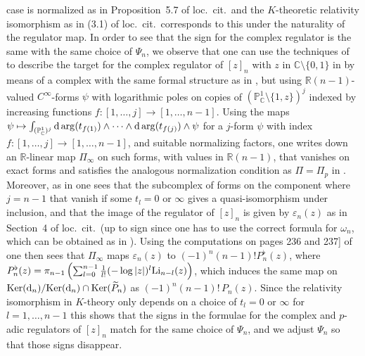 \documentclass{amsart}
\begin{document}
\begin{remark}
{{{\fi}}} case is normalized as in Proposition~5.7 of loc.\
cit.\ and the $ K $-theoretic relativity isomorphism as in (3.1) of loc.\ cit.\ 
corresponds to this under the naturality of the regulator map.
In order to see that the sign for the complex regulator is the same with the same choice of $ \Psi_n $,
we observe that one can use the techniques of \cite[Appendix~A and Section~5]{BdJ03} to describe the target
for the complex regulator of $ [z]_n $ with $ z $ in $ {\mathbb C}\setminus\{0,1\} $ in \cite{dJ95}
by means of a complex with the same formal structure as in \cite[Definition~5.2]{BdJ03}, but using
$ {\mathbb R}(n-1) $-valued $ C^\infty $-forms $ \psi $ with logarithmic poles on copies of $ (\mathbb{P}_{\mathbb C}^1\!\setminus\!\{1,z\})^j $
indexed by increasing functions $ f : [1,\dots,j] \to [1,\dots,n-1] $.  Using the maps
$ \psi \mapsto \int_{ (\mathbb{P}_{\mathbb C}^1)^j} {{\textup{d}}} \arg(t_{f(1)}) \wedge \cdots \wedge {{\textup{d}}} \arg(t_{f(j)}) \wedge \psi $
for a $ j $-form $ \psi $ with index $ f : [1,\dots,j] \to [1,\dots,n-1] $, and suitable normalizing factors, one writes down an $ {\mathbb R} $-linear map $ \Pi_\infty $ on such forms, with values in
$ {\mathbb R}(n-1) $, that vanishes on exact forms and satisfies the analogous normalization condition as $ \Pi=\Pi_p $
in \cite[Proposition~5.7]{BdJ03}.  Moreover, as in \cite[Section~2.5]{dJ95} one sees that the subcomplex
of forms on the component where $ j=n-1 $ that vanish if some $ t_l = 0 $ or $ \infty $ gives a quasi-isomorphism
under inclusion, and that the image of the regulator of $ [z]_n $ is given by $ \varepsilon_n(z) $ 
as in Section~4 of loc.\ cit.\ (up to sign since one has to use
the correct formula for $ \omega_n $, which can be obtained as in \cite[Section~6]{BdJ03}).
Using the computations on pages 236 and 237] of \cite{dJ95} one then sees that $ \Pi_\infty $ maps
$ \varepsilon_n(z) $ to $ (-1)^n (n-1)! P_n^\flat (z) $, where
$ P_n^\flat(z) =  \pi_{n-1}\left( \sum_{l=0}^{n-1} \frac{1}{l!} (-\log|z|)^l {\textup{Li}}_{n-l}(z) \right) $,
which induces the same map on $ {\operatorname{Ker}}({{\textup{d}}}_n)/{\operatorname{Ker}}({{\textup{d}}}_n) \cap {\operatorname{Ker}}(\widetilde P_n) $  as $ (-1)^n (n-1)! \, P_n(z) $.
Since the relativity isomorphism in $ K $-theory only depends on a choice of $ t_l =0 $ or $ \infty $ for
$ l=1,\dots,n-1 $ this shows that the signs in the formulae for the complex and {$p$-adic{\futurelet\comingchar{\relax\ifmmode\else
  \ifcat A\noexpand\comingchar{} \fi
  \ifcat 0\noexpand\comingchar
  \ifx 0\noexpand\comingchar{} \fi
  \ifx 1\noexpand\comingchar{} \fi\ifx 2\noexpand\comingchar{} \fi
  \ifx 3\noexpand\comingchar{} \fi\ifx 4\noexpand\comingchar{} \fi
  \ifx 5\noexpand\comingchar{} \fi\ifx 6\noexpand\comingchar{} \fi
  \ifx 7\noexpand\comingchar{} \fi\ifx 8\noexpand\comingchar{} \fi
  \ifx 9\noexpand\comingchar{} \fi\fi
  \ifcat $\noexpand\comingchar{} \fi
  \ifcat \noexpand\relax\noexpand\comingchar{} \fi
\fi}}} regulators of
$ [z]_n $ match for the same choice of $ \Psi_n $, and we adjust $ \Psi_n $ so that those signs disappear.
\end{remark}
\end{document}
